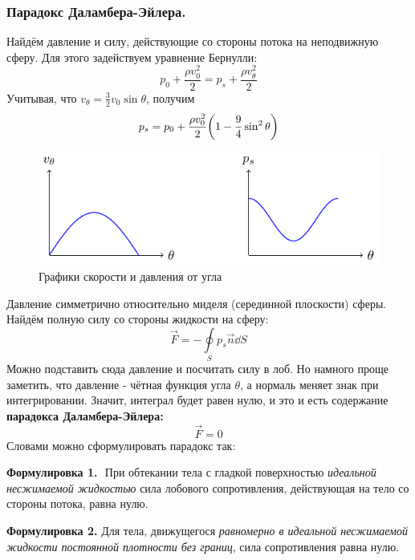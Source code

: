 \subsubsection{Парадокс Даламбера-Эйлера.} Найдём давление и силу, 
действующие со стороны потока на неподвижную сферу. Для этого задействуем
 уравнение Бернулли:
\begin{equation}
    p_0 + \frac{\rho v_0^2}{2} = 
    p_s + \frac{\rho v_\theta^2}{2}
\end{equation}
Учитывая, что $v_\theta=\frac{3}{2}v_0\sin\theta$, получим
\begin{equation}
    p_s = p_0 + \frac{\rho v_0^2}{2}\qty(1-\frac{9}{4}\sin^2\theta)
\end{equation}
\begin{figure}[H]
    \centering
    \includegraphics[scale=1.5]{img/p_vtheta}
    \caption{Графики скорости и давления от угла}
    \label{fig:pandv}
\end{figure}
Давление симметрично относительно миделя (серединной плоскости) сферы. Найдём полную силу со стороны жидкости на сферу:
\begin{equation}
    \vec{F} = - \oint\limits_S p_s \vec{n} \dd{S}
\end{equation}
Можно подставить сюда давление и посчитать силу в лоб. Но намного проще
 заметить, что давление - чётная функция угла $\theta$, а нормаль 
 меняет знак при интегрировании. Значит, интеграл будет равен нулю, и
 это и есть содержание \textbf{парадокса Даламбера-Эйлера:}
 \begin{equation}
     \vec{F}=0
 \end{equation}
Словами можно сформулировать парадокс так:

\textbf{Формулировка 1.\,\, }{При обтекании тела с гладкой поверхностью \textit{идеальной несжимаемой
    жидкостью} сила лобового сопротивления, действующая на тело со
стороны потока, равна нулю.}


\textbf{Формулировка 2. }{Для тела, движущегося \textit{равномерно в идеальной несжимаемой
    жидкости постоянной плотности без границ}, сила сопротивления
равна нулю.}

